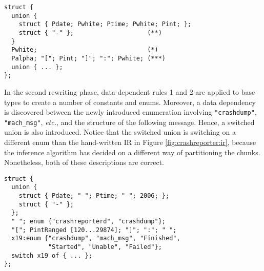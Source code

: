 {\small
\begin{verbatim}
struct {
  union {
    struct { Pdate; Pwhite; Ptime; Pwhite; Pint; };
    struct { "-" };                    (**)
  }
  Pwhite;                              (*)
  Palpha; "["; Pint; "]"; ":"; Pwhite; (***)
  union { ... };
};
\end{verbatim}
}


In the second rewriting phase, 
data-dependent rules 1 and 2 are applied to base types to 
create a number of constants and enums.
Moreover, a data dependency is discovered between the
newly introduced enumeration involving {\tt "crashdump"},
{\tt "mach\_msg"}, {\em etc.}, and the structure of the following message.
Hence, a switched union is also introduced.
Notice that the switched union is switching on a different enum 
than the hand-written IR in Figure \ref{fig:crashreporter:ir}, because
the inference algorithm has decided on a different way of partitioning
the chunks. Nonetheless, both of these descriptions are
correct.


{\small
\begin{verbatim}
struct {
  union {
    struct { Pdate; " "; Ptime; " "; 2006; };
    struct { "-" };
  };
  " "; enum {"crashreporterd", "crashdump"};
  "["; PintRanged [120...29874]; "]"; ":"; " ";
  x19:enum {"crashdump", "mach_msg", "Finished", 
            "Started", "Unable", "Failed"};
  switch x19 of { ... };
};
\end{verbatim}
}



